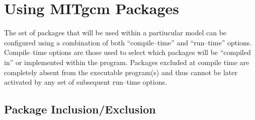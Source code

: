 
\section{Using MITgcm Packages}

The set of packages that will be used within a partiucular model can
be configured using a combination of both ``compile--time'' and
``run--time'' options.  Compile--time options are those used to select
which packages will be ``compiled in'' or implemented within the
program.  Packages excluded at compile time are completely absent from
the executable program(s) and thus cannot be later activated by any
set of subsequent run--time options.

\subsection{Package Inclusion/Exclusion}

